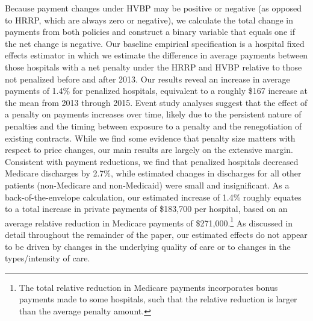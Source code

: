 \documentclass[12pt]{article}
\begin{document}
Because payment changes under HVBP may be positive or negative (as opposed to HRRP, which are always zero or negative), we calculate the total change in payments from both policies and construct a binary variable that equals one if the net change is negative.  Our baseline empirical specification is a hospital fixed effects estimator in which we estimate the difference in average payments between those hospitals with a net penalty under the HRRP and HVBP relative to those not penalized before and after 2013. Our results reveal an increase in average payments of 1.4\% for penalized hospitals, equivalent to a roughly \$167 increase at the mean from 2013 through 2015. Event study analyses suggest that the effect of a penalty on payments increases over time, likely due to the persistent nature of penalties and the timing between exposure to a penalty and the renegotiation of existing contracts.  While we find some evidence that penalty size matters with respect to price changes, our main results are largely on the extensive margin. Consistent with payment reductions, we find that penalized hospitals decreased Medicare discharges by 2.7\%, while estimated changes in discharges for all other patients (non-Medicare and non-Medicaid) were small and insignificant. As a back-of-the-envelope calculation, our estimated increase of 1.4\% roughly equates to a total increase in private payments of \$183,700 per hospital, based on an average relative reduction in Medicare payments of \$271,000.\footnote{The total relative reduction in Medicare payments incorporates bonus payments made to some hospitals, such that the relative reduction is larger than the average penalty amount.} As discussed in detail throughout the remainder of the paper, our estimated effects do not appear to be driven by changes in the underlying quality of care or to changes in the types/intensity of care.
\end{document}
